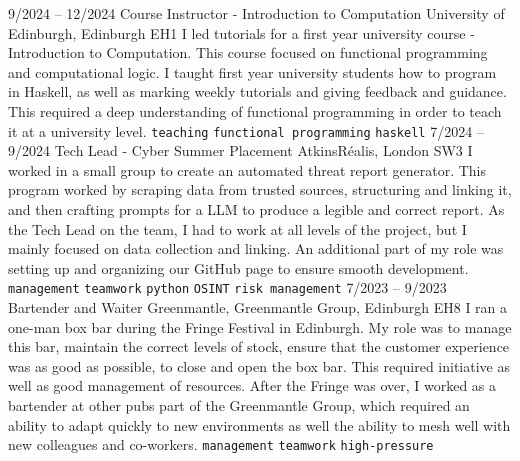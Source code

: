 \documentclass[9pt]{developercv} %
\begin{document}
\vspace{-10 pt}
\begin{entrylist}
	\entry
	{9/2024 --  12/2024}
	{Course Instructor - Introduction to Computation}
	{University of Edinburgh, Edinburgh EH1}
	{
		I led tutorials for a first year university course - Introduction to Computation.
		This course focused on functional programming and computational logic.
		I taught first year university students how to program in Haskell, as well as marking weekly tutorials and giving feedback and guidance.
		This required a deep understanding of functional programming in order to teach it at a university level.
		\newline
		\texttt{teaching} \slashsep \texttt{functional programming} \slashsep \texttt{haskell}
	}
	\entry
	{7/2024 --  9/2024}
	{Tech Lead - Cyber Summer Placement}
	{AtkinsRéalis, London SW3}
	{
		I worked in a small group to create an automated threat report generator.
		This program worked by scraping data from trusted sources, structuring and linking it, and then crafting prompts for a LLM to produce a legible and correct report.
		As the Tech Lead on the team, I had to work at all levels of the project, but I mainly focused on data collection and linking.
		An additional part of my role was setting up and organizing our GitHub page to ensure smooth development.
		\newline
		\texttt{management} \slashsep \texttt{teamwork} \slashsep \texttt{python} \slashsep \texttt{OSINT} \slashsep \texttt{risk management}
	}
	\entry
        {7/2023 --  9/2023}
		{Bartender and Waiter}
		{Greenmantle, Greenmantle Group, Edinburgh EH8}
		{
			I ran a one-man box bar during the Fringe Festival in Edinburgh. 
			My role was to manage this bar, maintain the correct levels of stock, ensure that the customer experience was as good as possible, to close and open the box bar.
			This required initiative as well as good management of resources.
			After the Fringe was over, I worked as a bartender at other pubs part of the Greenmantle Group, which required an ability to adapt quickly to new environments as well the ability to mesh well with new colleagues and co-workers.
        	\newline
			\texttt{management} \slashsep \texttt{teamwork} \slashsep \texttt{high-pressure}
		}
\end{entrylist}
\end{document}

